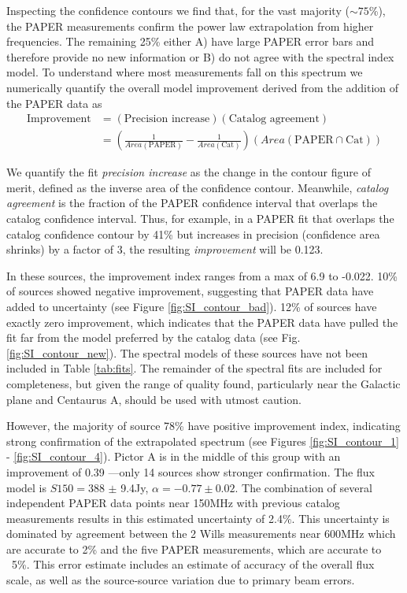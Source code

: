 \documentclass[preprint]{aastex}
\newcommand{\PAPER}{\mathrm{PAPER}}
\begin{document}
Inspecting the confidence contours we find that, for the vast majority ($\sim
75$\%), the PAPER measurements confirm the power law extrapolation from higher
frequencies. The remaining 25\% either A) have large PAPER error bars and
therefore provide no new information or B) do not agree with the spectral index
model.  To understand where most measurements fall on this spectrum we
numerically quantify the overall model improvement derived from the addition of
the PAPER data as 
\begin{align}
\textrm{Improvement} &= \left(\textrm{Precision increase}\right) \left(\textrm{Catalog agreement}\right)\\
&= \left(\frac{1}{Area(\textrm{PAPER})} - \frac{1}{Area(\textrm{Cat})}\right) \left( Area(\PAPER \cap \textrm{Cat}) \right)
\end{align}

We quantify the fit {\em precision increase} as the change in the contour
figure of merit, defined as the inverse area of the confidence contour.
Meanwhile, {\em catalog agreement} is the fraction of the PAPER confidence
interval that overlaps the catalog confidence interval.  Thus, for example, in
a PAPER fit that overlaps the catalog confidence contour by 41\% but increases
in precision (confidence area shrinks) by a factor of 3, the resulting {\em
improvement} will be 0.123.  

In these sources, the improvement index ranges from a max of 6.9 to -0.022.
10\% of sources showed negative improvement, suggesting that PAPER data have
added to uncertainty (see Figure \ref{fig:SI_contour_bad}). 12\% of sources
have exactly zero improvement, which indicates that the PAPER data have pulled
the fit far from the model preferred by the catalog data (see Fig.
\ref{fig:SI_contour_new}).  The spectral models of these sources have not been
included in Table \ref{tab:fits}.  The remainder of the spectral fits are
included for completeness, but given the range of quality found, particularly
near the Galactic plane and Centaurus A, should be used with utmost caution.

However, the majority of source 78\% have positive improvement index,
indicating strong confirmation of the extrapolated spectrum (see Figures
\ref{fig:SI_contour_1} - \ref{fig:SI_contour_4}).  Pictor A is in the middle of
this group  with an improvement of 0.39 ---only 14 sources show stronger
confirmation.  The flux model is $S150=$388 $\pm$ 9.4Jy, $\alpha=-0.77\pm0.02$.
The combination of several independent PAPER data points near 150MHz with
previous catalog measurements results in this estimated uncertainty of 2.4\%.
This uncertainty is dominated by agreement between the 2 Wills measurements
near 600MHz which are accurate to 2\% and the five PAPER measurements, which
are accurate to ~5\%.  This error estimate includes an estimate of accuracy of the overall flux scale,
as well as the source-source variation due to primary beam errors. 
\end{document}
